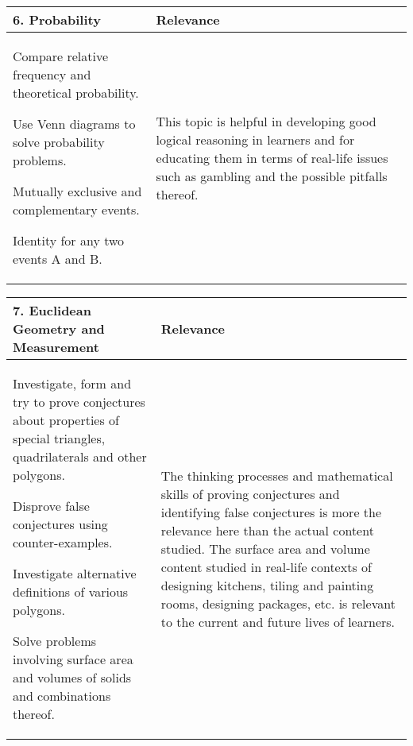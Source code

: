 \begin{table}[H]
 \begin{center} 
\begin{tabular}{|p{8.5cm}|p{3.5cm}|} \hline
\textbf{6. Probability}& \textbf{Relevance} \\ \hline  

Compare relative frequency and theoretical probability.\par
Use Venn diagrams to solve probability problems.\par
Mutually exclusive and complementary events.\par
Identity for any two events A and B. \par
& This topic is helpful in developing good logical reasoning in learners and for educating them in terms of real-life issues such as gambling and the possible pitfalls thereof. 
\\ \hline

 \end{tabular}
\end{center}
\end{table}


\begin{table}[H]
 \begin{center} 
\begin{tabular}{|p{8.5cm}|p{3.5cm}|} \hline
\textbf{7. Euclidean Geometry and Measurement}& \textbf{Relevance}\\ \hline  

Investigate, form and try to prove conjectures about properties of special triangles, quadrilaterals and other polygons.\par
Disprove false conjectures using counter-examples.\par
Investigate alternative definitions of various polygons.\par
Solve problems involving surface area and volumes of solids and combinations thereof.
& The thinking processes and mathematical skills of proving conjectures and identifying false conjectures is more the relevance here than the actual content studied. The surface area and volume content studied in real-life contexts of designing kitchens, tiling and painting rooms, designing packages, etc. is relevant to the current and future lives of learners. 
\\ \hline

 \end{tabular}
\end{center}
\end{table}

